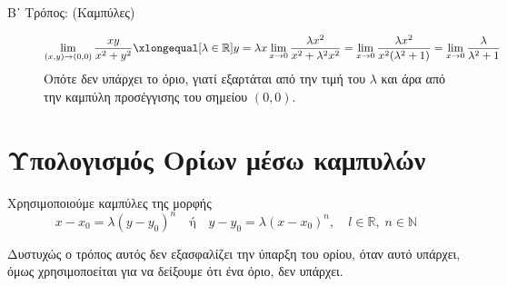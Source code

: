 \begin{examples}
\begin{enumerate}
            \begin{description}
                \item [Β᾽ Τρόπος: (Καμπύλες)]
                    \[
                        \lim\limits_{(x,y)\to (0, 0)} \frac{xy}{x^{2}+y^{2}} 
                        \xlongequal[\lambda \in \mathbb{R}]{y= \lambda x} \lim_{x \to 0}
                        \frac{\lambda x^{2}}{x^{2}+ \lambda^{2} x^{2}} = \lim_{x \to 0} 
                        \frac{\lambda x^{2}}{x^{2}(\lambda ^{2}+1)} = \lim_{x \to 0} 
                        \frac{\lambda}{\lambda ^{2}+1} 
                    \]
                    Οπότε δεν υπάρχει το όριο, γιατί εξαρτάται από την τιμή του 
                    $ \lambda $ και άρα από την καμπύλη προσέγγισης του σημείου 
                    $ (0,0) $.
            \end{description}
    \end{enumerate}
\end{examples}


\section{Υπολογισμός Ορίων μέσω καμπυλών}

Χρησιμοποιούμε καμπύλες της μορφής 
\[ 
    x - x_{0} = \lambda (y- y_{0})^{n} \quad \text{ή} 
    \quad y- y_{0} = \lambda (x- x_{0})^{n}, \quad l \in \mathbb{R}, \; n \in 
    \mathbb{N}  
\]

\begin{rem}
    Δυστυχώς ο τρόπος αυτός δεν εξασφαλίζει την ύπαρξη του ορίου, όταν αυτό υπάρχει, 
    όμως χρησιμοποείται για να δείξουμε ότι ένα όριο, δεν υπάρχει.
\end{rem}

